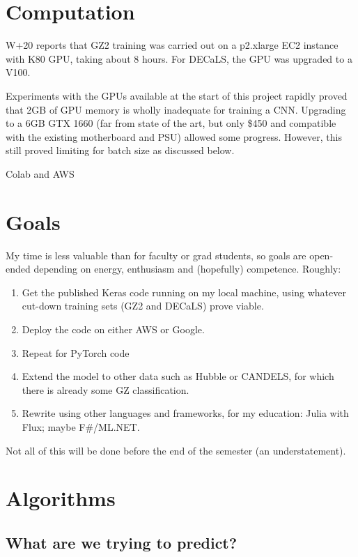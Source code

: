 \documentclass[preprint]{aastex631}
\newcommand{\todo}{\color{red}{TODO}\color{black}\hspace{2mm}}
\begin{document}
\section{Computation} \label{sec:comp}

W+20 reports that GZ2 training was carried out on a p2.xlarge EC2 instance with K80 GPU, taking about 8 hours. For DECaLS, the GPU was upgraded to a V100.

Experiments with the GPUs available at the start of this project rapidly proved that 2GB of GPU memory is wholly inadequate for training a CNN. Upgrading to a 6GB GTX 1660 (far from state of the art, but only \$450 and compatible with the existing motherboard and PSU) allowed some progress. However, this still proved limiting for batch size as discussed below.

\todo Colab and AWS


\section{Goals} \label{sec:goals}

My time is less valuable than for faculty or grad students, so goals are open-ended depending on energy, enthusiasm and (hopefully) competence. Roughly:
\begin{enumerate}
	\item Get the published Keras code running on my local machine, using whatever cut-down training sets (GZ2 and DECaLS) prove viable.
	\item Deploy the code on either AWS or Google.
	\item Repeat for PyTorch code
	\item Extend the model to other data such as Hubble or CANDELS, for which there is already some GZ classification.
	\item Rewrite using other languages and frameworks, for my education: Julia with Flux; maybe F\#/ML.NET.
\end{enumerate}

Not all of this will be done before the end of the semester (an understatement).

\section{Algorithms} \label{algorithms}

\subsection{What are we trying to predict?}
\end{document}
